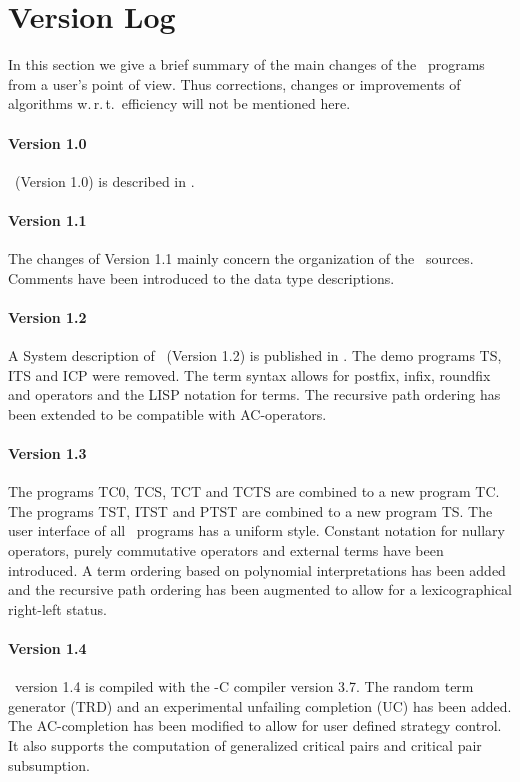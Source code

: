 \section{Version Log}

In this  section we give a brief summary of the main changes
of the \redux\ programs from a user's point of view.
Thus corrections, changes or improvements of algorithms
w.\,r.\,t.\ efficiency  will not be mentioned here.

\paragraph{Version 1.0}
\redux\ (Version 1.0) is described in \cite{WalterBuendgen:91}.

\paragraph{Version 1.1}
The changes of Version 1.1 mainly concern the organization of the \redux\ 
sources.
Comments have been introduced to the data type descriptions.

\paragraph{Version 1.2}
A System description of \redux\  (Version 1.2) is published in
\cite{Buendgen:93}.
The demo programs TS, ITS and ICP were removed.
The term syntax allows for postfix, infix, roundfix and operators and
the LISP notation for terms.
The recursive path ordering has been extended to be compatible with
AC-operators.

\paragraph{Version 1.3}
The programs TC0, TCS, TCT and TCTS are combined to a new program TC.
The programs TST, ITST and PTST are  combined to a new program TS.
The user interface of all \redux\ programs has a uniform style.
Constant notation for nullary operators, purely commutative operators
and external terms have been  introduced.
A term ordering based on polynomial interpretations has been added and
the recursive path ordering has been augmented to allow for a
lexicographical right-left status.

\paragraph{Version 1.4}
\redux\ version 1.4 is compiled with the \ALDES-C compiler version 3.7.
The random term generator (TRD) and an experimental unfailing completion 
(UC) has been added.
The AC-completion has been modified to allow for user defined
strategy control.
It also supports the computation of generalized critical pairs and
critical pair subsumption.

